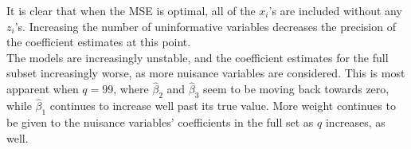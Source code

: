 \documentclass[a4paper]{article}
\begin{document}
It is clear that when the MSE is optimal, all of the $x_i$'s are included
without any $z_i$'s.  Increasing the number of uninformative variables
decreases the precision of the coefficient estimates at this point.\\

The models are increasingly unstable, and the coefficient estimates for the
full subset increasingly worse, as more nuisance variables
are considered.  This is most apparent when $q=99$, where $\hat{\beta}_2$
and $\hat{\beta}_3$ seem to be moving back towards zero, while $\hat{\beta}_1$
continues to increase well past its true value.  More weight continues to
be given to the nuisance variables' coefficients in the full set as $q$ increases, as well.\\
\end{document}
